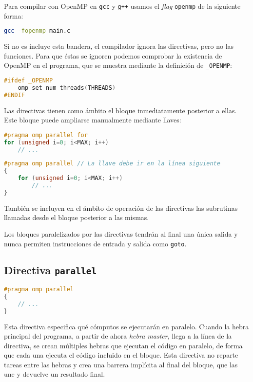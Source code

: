 Para compilar con OpenMP en \texttt{gcc} y \texttt{g++} usamos el \textit{flag} \texttt{openmp} de la siguiente forma:

\begin{lstlisting}[language=sh]
gcc -fopenmp main.c
\end{lstlisting}

Si no es incluye esta bandera, el compilador ignora las directivas, pero no las funciones.
Para que éstas se ignoren podemos comprobar la existencia de OpenMP en el programa, que se muestra mediante la definición de \texttt{\_OPENMP}:

\begin{lstlisting}[language=C]
#ifdef _OPENMP
	omp_set_num_threads(THREADS)
#ENDIF
\end{lstlisting}

Las directivas tienen como ámbito el bloque inmediatamente posterior a ellas.
Este bloque puede ampliarse manualmente mediante llaves:

\begin{lstlisting}[language=C]
#pragma omp parallel for
for (unsigned i=0; i<MAX; i++)
	// ...
\end{lstlisting}

\begin{lstlisting}[language=C]
#pragma omp parallel // La llave debe ir en la línea siguiente
{
	for (unsigned i=0; i<MAX; i++)
		// ...
}
\end{lstlisting}

También se incluyen en el ámbito de operación de las directivas las subrutinas llamadas desde el bloque posterior a las mismas.

Los bloques paralelizados por las directivas tendrán al final una única salida y nunca permiten instrucciones de entrada y salida como \texttt{goto}.

\subsection{Directiva \texttt{parallel}}\label{directivas-openmp-directivas-parallel}

\begin{lstlisting}[language=C]
#pragma omp parallel
{
	// ...
}
\end{lstlisting}

Esta directiva especifica qué cómputos se ejecutarán en paralelo.
Cuando la hebra principal del programa, a partir de ahora \textit{hebra master}, llega a la línea de la directiva, se crean múltiples hebras que ejecutan el código en paralelo, de forma que cada una ejecuta el código incluido en el bloque.
Esta directiva no reparte tareas entre las hebras y crea una barrera implícita al final del bloque, que las une y devuelve un resultado final.

